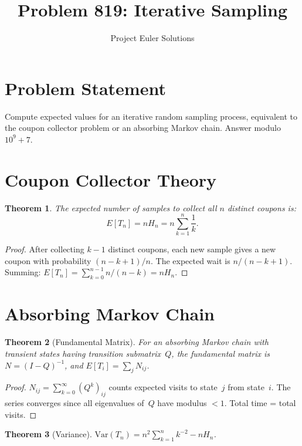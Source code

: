 \documentclass[11pt]{article}
\title{Problem 819: Iterative Sampling}
\author{Project Euler Solutions}
\date{}
\newtheorem{theorem}{Theorem}
\begin{document}
\maketitle

\section{Problem Statement}

Compute expected values for an iterative random sampling process, equivalent to the coupon collector problem or an absorbing Markov chain. Answer modulo $10^9+7$.

\section{Coupon Collector Theory}

\begin{theorem}
The expected number of samples to collect all $n$ distinct coupons is:
\[
E[T_n] = n H_n = n \sum_{k=1}^{n} \frac{1}{k}.
\]
\end{theorem}

\begin{proof}
After collecting $k-1$ distinct coupons, each new sample gives a new coupon with probability $(n-k+1)/n$. The expected wait is $n/(n-k+1)$. Summing: $E[T_n] = \sum_{k=0}^{n-1} n/(n-k) = n H_n$.
\end{proof}

\section{Absorbing Markov Chain}

\begin{theorem}[Fundamental Matrix]
For an absorbing Markov chain with transient states having transition submatrix~$Q$, the fundamental matrix is $N = (I-Q)^{-1}$, and $E[T_i] = \sum_j N_{ij}$.
\end{theorem}

\begin{proof}
$N_{ij} = \sum_{k=0}^{\infty} (Q^k)_{ij}$ counts expected visits to state~$j$ from state~$i$. The series converges since all eigenvalues of~$Q$ have modulus $< 1$. Total time = total visits.
\end{proof}

\begin{theorem}[Variance]
$\mathrm{Var}(T_n) = n^2 \sum_{k=1}^{n} k^{-2} - n H_n$.
\end{theorem}
\end{document}
